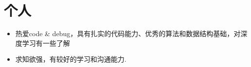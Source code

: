 \documentclass[letterpaper,11pt]{article}
\newcommand{\resumeSubHeadingListStart}{\begin{itemize}[leftmargin=*]}
\newcommand{\resumeSubHeadingListEnd}{\end{itemize}}
\begin{document}
\section{个人}
 \resumeSubHeadingListStart
   \item{
     {热爱code \& debug，具有扎实的代码能力、优秀的算法和数据结构基础，对深度学习有一些了解}
   }
   \item{
    求知欲强，有较好的学习和沟通能力.
   }   
 \resumeSubHeadingListEnd


\end{document}
